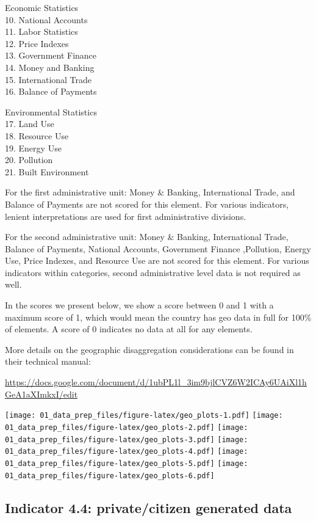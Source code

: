\documentclass[]{article}
\begin{document}
Economic Statistics\\
10. National Accounts\\
11. Labor Statistics\\
12. Price Indexes\\
13. Government Finance\\
14. Money and Banking\\
15. International Trade\\
16. Balance of Payments

Environmental Statistics\\
17. Land Use\\
18. Resource Use\\
19. Energy Use\\
20. Pollution\\
21. Built Environment

For the first administrative unit: Money \& Banking, International
Trade, and Balance of Payments are not scored for this element. For
various indicators, lenient interpretations are used for first
administrative divisions.

For the second administrative unit: Money \& Banking, International
Trade, Balance of Payments, National Accounts, Government Finance
,Pollution, Energy Use, Price Indexes, and Resource Use are not scored
for this element. For various indicators within categories, second
administrative level data is not required as well.

In the scores we present below, we show a score between 0 and 1 with a
maximum score of 1, which would mean the country has geo data in full
for 100\% of elements. A score of 0 indicates no data at all for any
elements.

More details on the geographic disaggregation considerations can be
found in their technical manual:

\url{https://docs.google.com/document/d/1ubPL1l_3im9bjlCVZ6W2ICAy6UAiXl1hGeA1aXImkxI/edit}

\texttt{[image: 01\_data\_prep\_files/figure-latex/geo\_plots-1.pdf]}
\texttt{[image: 01\_data\_prep\_files/figure-latex/geo\_plots-2.pdf]}
\texttt{[image: 01\_data\_prep\_files/figure-latex/geo\_plots-3.pdf]}
\texttt{[image: 01\_data\_prep\_files/figure-latex/geo\_plots-4.pdf]}
\texttt{[image: 01\_data\_prep\_files/figure-latex/geo\_plots-5.pdf]}
\texttt{[image: 01\_data\_prep\_files/figure-latex/geo\_plots-6.pdf]}

\hypertarget{indicator-4.4-privatecitizen-generated-data}{%
\subsection{Indicator 4.4: private/citizen generated
data}\label{indicator-4.4-privatecitizen-generated-data}}
\end{document}
